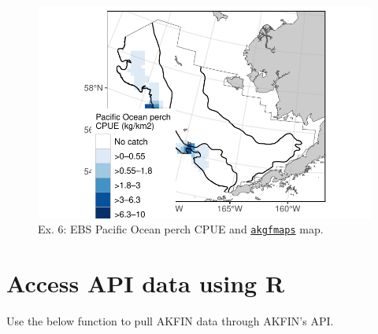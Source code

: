 \documentclass[
  letterpaper,
  oneside,
  open=any]{scrbook}
\begin{document}
\begin{figure}[H]

{\centering \includegraphics{content/akfin-oracle-sql-r_files/figure-pdf/test-6-fig-1.pdf}

}

\caption{Ex. 6: EBS Pacific Ocean perch CPUE and
\href{https://github.com/afsc-gap-products/akgfmaps}{\texttt{akgfmaps}}
map.}

\end{figure}

\hypertarget{access-api-data-using-r}{%
\chapter{Access API data using R}\label{access-api-data-using-r}}

Use the below function to pull AKFIN data through AKFIN's API.
\end{document}
